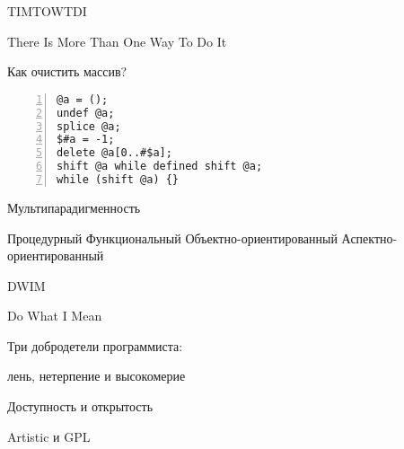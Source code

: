 \documentclass[14pt]{beamer}
\begin{document}
\begin{frame}
    \begin{center}
    TIMTOWTDI

    There Is More Than One Way To Do It
    \end{center}
\end{frame}

\begin{frame}[fragile]
    \begin{center}
    Как очистить массив?

    \lstset{language=Perl}
    \begin{lstlisting}[numbers=left]
@a = ();
undef @a;
splice @a;
$#a = -1;
delete @a[0..#$a];
shift @a while defined shift @a;
while (shift @a) {}
    \end{lstlisting}
    \end{center}
\end{frame}

\begin{frame}
    \begin{center}
    Мультипарадигменность

    Процедурный Функциональный Объектно-ориентированный Аспектно-ориентированный
    \end{center}
\end{frame}

\begin{frame}
    \begin{center}
    DWIM

    Do What I Mean
    \end{center}
\end{frame}

\begin{frame}
    \begin{center}
    Три добродетели программиста:

    лень, нетерпение и высокомерие
    \end{center}
\end{frame}

\begin{frame}
    \begin{center}
        Доступность и открытость
    \end{center}
\end{frame}

\begin{frame}
    \begin{center}
        Artistic и GPL
    \end{center}
\end{frame}
\end{document}
